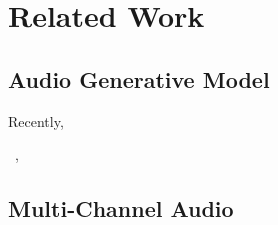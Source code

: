 \section{Related Work}
\label{sec:related_work}
\subsection{Audio Generative Model}
Recently, 

~\cite{wavenet}, ~\cite{gansynth}   
\subsection{Multi-Channel Audio}